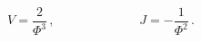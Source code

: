 \begin{equation*}
V=\frac{2}{\Phi ^{3}}\,,\ \ \ \ \ \ \ \ \ \ \ \ \ \ \ \ \ \ \ \ \ \ \ \ \ \
\ \ \ \ J=-\frac{1}{\Phi ^{2}}\,.
\end{equation*}

